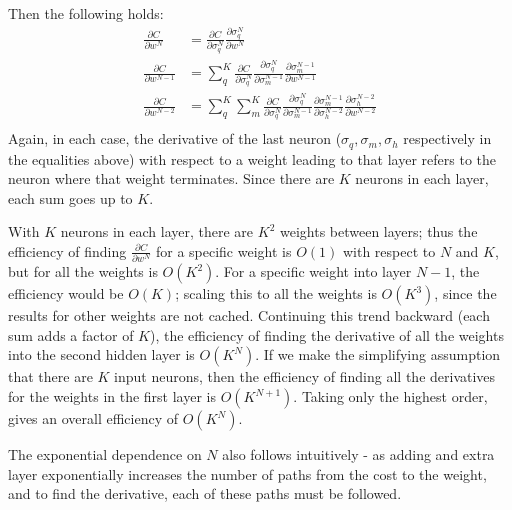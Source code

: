 \documentclass{article}
\begin{document}
   Then the following holds: %
      \begin{equation*} \begin{split}
        \frac{ \partial C}{ \partial w^{N} }
           &= \frac{ \partial C}{ \partial \sigma^N_q }  \frac{ \partial \sigma^N_q}{ \partial w^{N} } \\
        \frac{ \partial C}{ \partial w^{N-1} }
           &= \sum_q^K \frac{ \partial C}{ \partial \sigma^{N}_q }  \frac{ \partial \sigma^{N}_q }{\partial \sigma^{N-1}_m}  \frac{ \partial \sigma^{N-1}_m }{ \partial w^{N-1} } \\
        \frac{ \partial C}{ \partial w^{N-2} }
           &= \sum_q^K \sum_m^K \frac{ \partial C}{ \partial \sigma^{N}_q }  \frac{ \partial \sigma^{N}_q }{\partial \sigma^{N-1}_m}   \frac{ \partial \sigma^{N-1}_m }{\partial \sigma^{N-2}_h}   \frac{ \partial \sigma^{N-2}_h }{ \partial w^{N-2} } \\
      \end{split} \end{equation*}
   Again, in each case, the derivative of the last neuron ($\sigma_q, \sigma_m, \sigma_h$ respectively in the
   equalities above) with respect to a weight leading to that layer refers to the neuron where
   that weight terminates.
   Since there are $K$ neurons in each layer, each sum goes up to $K$.

   With $K$ neurons in each layer, there are $K^2$ weights between layers; thus the efficiency of
   finding $ \frac{ \partial C}{ \partial w^{N} } $ for a specific weight is $O(1)$ with respect
   to $N$ and $K$, but for all the weights is $O(K^2)$.
   For a specific weight into layer $N-1$, the efficiency would be $O(K)$; scaling this to
   all the weights is $O(K^3)$, since the results for other weights are not cached.
   Continuing this trend backward (each sum adds a factor of $K$), the efficiency of finding the derivative of all the weights
   into the second hidden layer is $O(K^{N})$.
   If we make the simplifying assumption that there are $K$ input neurons, then the efficiency
   of finding all the derivatives for the weights in the first layer is $O(K^{N+1})$.
   Taking only the highest order, gives an overall efficiency of $O(K^{N})$.

   The exponential dependence on $N$ also follows intuitively - as adding and extra layer
   exponentially increases the number of paths from the cost to the weight, and to find
   the derivative, each of these paths must be followed.
\end{document}
